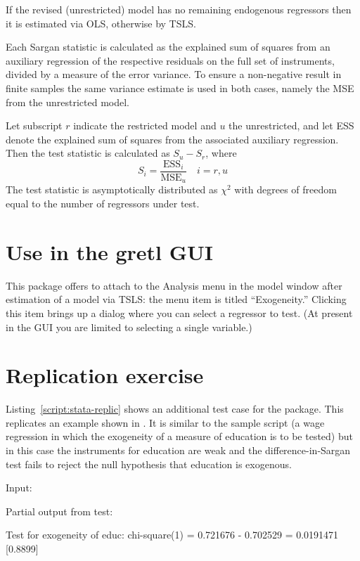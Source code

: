 \documentclass{article}
\begin{document}
If the revised (unrestricted) model has no remaining endogenous
regressors then it is estimated via OLS, otherwise by TSLS.

Each Sargan statistic is calculated as the explained sum of squares
from an auxiliary regression of the respective residuals on the full
set of instruments, divided by a measure of the error variance. To
ensure a non-negative result in finite samples the same variance
estimate is used in both cases, namely the MSE from the unrestricted
model.

Let subscript $r$ indicate the restricted model and $u$ the
unrestricted, and let ESS denote the explained sum of squares from the
associated auxiliary regression. Then the test statistic is calculated
as $S_u - S_r$, where
\[
  S_i = \frac{\mbox{ESS}_i}{\mbox{MSE}_u} \quad i=r,u
\]
The test statistic is asymptotically distributed as $\chi^2$ with
degrees of freedom equal to the number of regressors under test.

\section{Use in the gretl GUI}

This package offers to attach to the \textsf{Analysis} menu in the
model window after estimation of a model via TSLS: the menu item is
titled ``Exogeneity.'' Clicking this item brings up a dialog where you
can select a regressor to test. (At present in the GUI you are limited
to selecting a single variable.)

\section{Replication exercise}

Listing~\ref{script:stata-replic} shows an additional test case for the
package. This replicates an example shown in
\citet[][section 5]{baum07}. It is similar to the sample script (a wage
regression in which the exogeneity of a measure of education is to be
tested) but in this case the instruments for education are weak and
the difference-in-Sargan test fails to reject the null hypothesis that
education is exogenous.

\begin{script}[htbp]
  \caption{Replication of example from Baum \textit{et al}}
  \label{script:stata-replic}
Input:
Partial output from test:
\begin{scodebit}
Test for exogeneity of educ:
 chi-square(1) = 0.721676 - 0.702529 = 0.0191471 [0.8899]
\end{scodebit}
\end{script}
\end{document}
